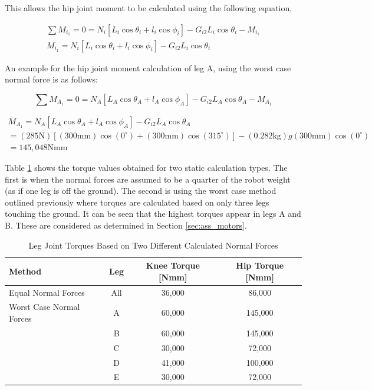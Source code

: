 This allows the hip joint moment to be calculated using the following equation.

\begin{gather}
    \sum M_{i_1} = 0 = N_i [L_i \cos{\theta_i} + l_i \cos{\phi_i}] - G_{i2} L_i \cos{\theta_i} - M_{i_1}
    \\
    M_{i_1} = N_i [L_i \cos{\theta_i} + l_i \cos{\phi_i}] - G_{i2} L_i \cos{\theta_i}
\end{gather}

An example for the hip joint moment calculation of leg A, using the worst case normal force is as follows:

\begin{equation}
    \sum M_{A_1} = 0 = N_A [L_A \cos{\theta_A} + l_A \cos{\phi_A}] - G_{i2} L_A \cos{\theta_A} - M_{A_1}
\end{equation}

\begin{equation}
\begin{split}
        M_{A_1} = N_A [L_A \cos{\theta_A} + l_A \cos{\phi_A}] - G_{i2} L_A \cos{\theta_A} 
        \\
        = (285 \text{N})[(300 \text{mm}) \cos{(0^{\circ})} + (300 \text{mm}) \cos{(315^{\circ})}] - (0.282 \text{kg})g (300 \text{mm}) \cos{(0^{\circ})} 
        \\= 145, 048 \text{Nmm}
\end{split}
\end{equation}

Table \ref{tab:torques} shows the torque values obtained for two static calculation types. The first is when the normal forces are assumed to be a quarter of the robot weight (as if one leg is off the ground). The second is using the worst case method outlined previously where torques are calculated based on only three legs touching the ground. It can be seen that the highest torques appear in legs A and B. These are considered as determined in Section \ref{sec:ass_motors}.

\begin{table}[H]
    \centering
    \caption{Leg Joint Torques Based on Two Different Calculated Normal Forces}
    \label{tab:torques}
    \begin{tabular}{l c c c}
        \\ \hline
        \textbf{Method} & \textbf{Leg} & \textbf{Knee Torque [Nmm]} & \textbf{Hip Torque [Nmm]}
        \\ \hline
        Equal Normal Forces & All & 36,000 & 86,000
        \\
        Worst Case Normal Forces & A & 60,000 & 145,000
        \\
          & B & 60,000 & 145,000
        \\
         & C & 30,000 & 72,000
        \\
         & D & 41,000 & 100,000
        \\
         & E & 30,000 & 72,000
        \\ \hline
    \end{tabular}
\end{table}


